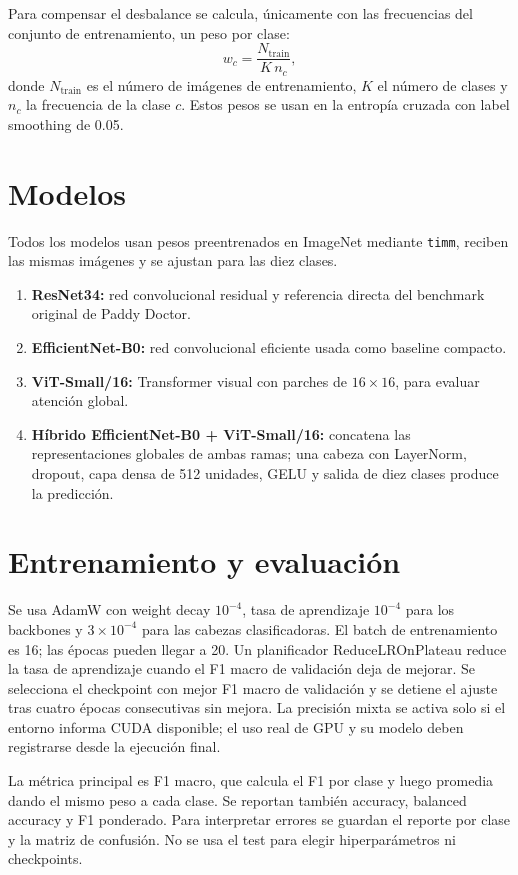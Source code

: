 \documentclass[11pt,a4paper]{article}
\begin{document}
Para compensar el desbalance se calcula, únicamente con las frecuencias del conjunto de entrenamiento, un peso por clase:
\[
w_c = \frac{N_{\mathrm{train}}}{K\,n_c},
\]
donde \(N_{\mathrm{train}}\) es el número de imágenes de entrenamiento, \(K\) el número de clases y \(n_c\) la frecuencia de la clase \(c\). Estos pesos se usan en la entropía cruzada con label smoothing de 0.05.

\section{Modelos}
Todos los modelos usan pesos preentrenados en ImageNet mediante \texttt{timm}, reciben las mismas imágenes y se ajustan para las diez clases.
\begin{enumerate}[leftmargin=*]
    \item \textbf{ResNet34:} red convolucional residual y referencia directa del benchmark original de Paddy Doctor.
    \item \textbf{EfficientNet-B0:} red convolucional eficiente usada como baseline compacto.
    \item \textbf{ViT-Small/16:} Transformer visual con parches de \(16\times16\), para evaluar atención global.
    \item \textbf{Híbrido EfficientNet-B0 + ViT-Small/16:} concatena las representaciones globales de ambas ramas; una cabeza con LayerNorm, dropout, capa densa de 512 unidades, GELU y salida de diez clases produce la predicción.
\end{enumerate}

\section{Entrenamiento y evaluación}
Se usa AdamW con weight decay \(10^{-4}\), tasa de aprendizaje \(10^{-4}\) para los backbones y \(3\times10^{-4}\) para las cabezas clasificadoras. El batch de entrenamiento es 16; las épocas pueden llegar a 20. Un planificador ReduceLROnPlateau reduce la tasa de aprendizaje cuando el F1 macro de validación deja de mejorar. Se selecciona el checkpoint con mejor F1 macro de validación y se detiene el ajuste tras cuatro épocas consecutivas sin mejora. La precisión mixta se activa solo si el entorno informa CUDA disponible; el uso real de GPU y su modelo deben registrarse desde la ejecución final.

La métrica principal es F1 macro, que calcula el F1 por clase y luego promedia dando el mismo peso a cada clase. Se reportan también accuracy, balanced accuracy y F1 ponderado. Para interpretar errores se guardan el reporte por clase y la matriz de confusión. No se usa el test para elegir hiperparámetros ni checkpoints.
\end{document}
